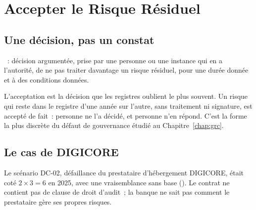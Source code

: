 \section{Accepter le Risque Résiduel}
\label{sec:c03-accepter}

\subsection{Une décision, pas un constat}

\begin{boxdef}
~: décision
argumentée, prise par une personne ou une instance qui en a l'autorité, de
ne pas traiter davantage un risque résiduel, pour une durée donnée et à
des conditions données.
\end{boxdef}

L'acceptation est la décision que les registres oublient le plus souvent.
Un risque qui reste dans le registre d'une année sur l'autre, sans
traitement ni signature, est accepté de fait~: personne ne l'a décidé, et
personne n'en répond. C'est la forme la plus discrète du défaut de
gouvernance étudié au Chapitre~\ref{chap:grc}.

\subsection{Le cas de DIGICORE}

Le scénario DC-02, défaillance du prestataire d'hébergement DIGICORE,
était coté $2 \times 3 = 6$ en 2025, avec une vraisemblance sans base
(\NEK{}). Le contrat ne contient pas de clause de droit d'audit~; la banque
ne sait pas comment le prestataire gère ses propres risques.

